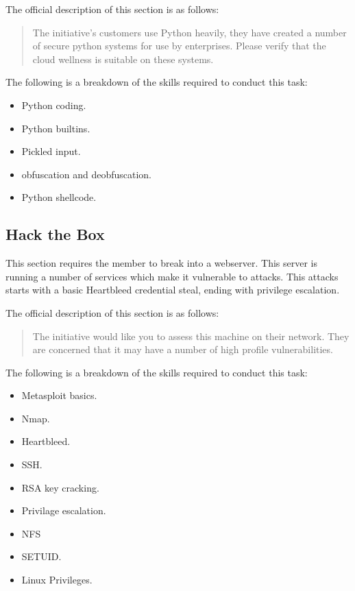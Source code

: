 \documentclass[a4paper,11pt]{report}
\begin{document}
			The official description of this section is as follows:
			\begin{quote}
The initiative's customers use Python heavily, they have created a number of secure python systems for use by enterprises. Please verify that the cloud wellness is suitable on these systems.
			\end{quote}

			The following is a breakdown of the skills required to conduct this task:
			\begin{itemize}
				\item Python coding.
				\item Python builtins. 
				\item Pickled input. 
				\item obfuscation and deobfuscation. 
				\item Python shellcode. 
			\end{itemize}

		\subsection{Hack the Box}
			This section requires the member to break into a webserver. 
			This server is running a number of services which make it vulnerable to attacks. 
			This attacks starts with a basic Heartbleed credential steal, ending with privilege escalation. 

			The official description of this section is as follows:
			\begin{quote}
				The initiative would like you to assess this machine on their network. They are concerned that it may have a number of high profile vulnerabilities.
			\end{quote}

			The following is a breakdown of the skills required to conduct this task:
			\begin{itemize}
				\item Metasploit basics. 
				\item Nmap.
				\item Heartbleed.
				\item SSH.
				\item RSA key cracking. 
				\item Privilage escalation. 
				\item NFS
				\item SETUID. 
				\item Linux Privileges. 
			\end{itemize}
\end{document}
